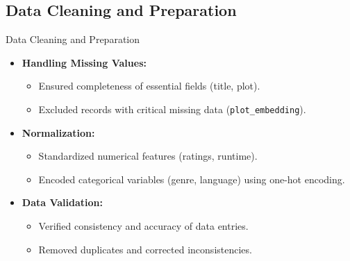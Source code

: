 \documentclass{beamer}
\begin{document}
\subsection{Data Cleaning and Preparation}
\begin{frame}{Data Cleaning and Preparation}
  \begin{itemize}
    \item \textbf{Handling Missing Values:}
      \begin{itemize}
        \item Ensured completeness of essential fields (title, plot).
        \item Excluded records with critical missing data (\texttt{plot\_embedding}).
      \end{itemize}
    \item \textbf{Normalization:}
      \begin{itemize}
        \item Standardized numerical features (ratings, runtime).
        \item Encoded categorical variables (genre, language) using one-hot encoding.
      \end{itemize}
    \item \textbf{Data Validation:}
      \begin{itemize}
        \item Verified consistency and accuracy of data entries.
        \item Removed duplicates and corrected inconsistencies.
      \end{itemize}
  \end{itemize}
\end{frame}

\end{document}
